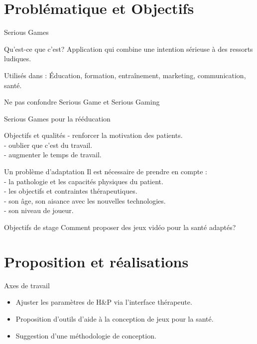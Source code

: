 \documentclass{beamer}
\begin{document}
	\section{Problématique et Objectifs}
		\begin{frame}{Serious Games}
			\begin{block}{Qu'est-ce que c'est?}
				Application qui combine une intention sérieuse à des ressorts ludiques.
			\end{block}\pause
			\begin{exampleblock}{Utilisés dans :}
				Éducation, formation, entraînement, marketing, communication, santé.
			\end{exampleblock}	\pause
			\begin{alertblock}{Ne pas confondre}
				Serious Game et Serious Gaming
			\end{alertblock}
		\end{frame}
	
		\begin{frame}{Serious Games pour la rééducation}
			\begin{exampleblock}{Objectifs et qualités}
				- renforcer la motivation des patients.\\
				- oublier que c'est du travail. \\
				- augmenter le temps de travail.
			\end{exampleblock}\pause
			\begin{alertblock}{Un problème d'adaptation}
			Il est nécessaire de prendre en compte :\\
					- la pathologie et les capacités physiques du patient.\\
					- les objectifs et contraintes thérapeutiques.\\
					- son âge, son aisance avec les nouvelles technologies.\\
					- son niveau de joueur.
			\end{alertblock}
		\end{frame}
	
		\begin{frame}{Objectifs de stage}		
			\large{Comment proposer des jeux vidéo pour la santé adaptés?}
		\end{frame}
		
	\section{Proposition et réalisations}	
		\begin{frame}
			\begin{block}{Axes de travail}			
				\begin{itemize}
					\item Ajuster les paramètres de H\&P via l'interface thérapeute.\\
					\item Proposition d'outils d'aide à la conception de jeux pour la santé.\\
					\item Suggestion d'une méthodologie de conception.
				\end{itemize}
			\end{block}
		\end{frame}		
			
\end{document}
